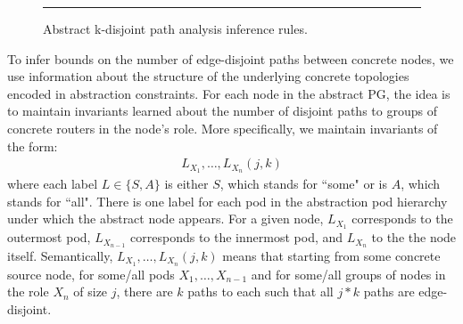 \documentclass[numbers, 10pt, preprint]{sigplanconf}
\begin{document}
\begin{figure}[t!]
  \begin{minipage}[t]{\linewidth}%
  \end{minipage}

  \vspace*{1em}
  \begin{minipage}[t]{\linewidth}%
  \end{minipage}

  \hrule
  \vspace*{1em}
  \caption{Abstract k-disjoint path analysis inference rules.}
  \label{fig:inference-rules}
  \vspace{-1.4em}
\end{figure}



%
To infer bounds on the number of edge-disjoint paths between concrete nodes, we use information about the structure of the underlying concrete topologies encoded in abstraction constraints.
%
For each node in the abstract PG,
the idea is to maintain invariants learned about the number of disjoint paths
to groups of concrete routers in the node's role.
More specifically, we maintain invariants of the form:
%
\[ \begin{array}{c}
  L_{X_1}, \ldots, L_{X_n}(j,k)
\end{array} \]
\noindent
%
where each label $L \in \{S,A\}$ is either $S$, which stands for ``some" or is $A$, which stands for ``all". There is one label for each pod in the abstraction pod hierarchy under which the abstract node appears. For a given node, $L_{X_1}$ corresponds to the outermost pod, $L_{X_{n-1}}$ corresponds to the innermost pod, and $L_{X_n}$ to the the node itself.
Semantically, $L_{X_1}, \ldots, L_{X_n}(j,k)$ means that starting from some concrete source node, for some/all pods $X_1, \ldots, X_{n-1}$
and for some/all groups of nodes in the role $X_n$ of size $j$,
there are $k$ paths to each such that all $j*k$ paths are edge-disjoint.
\end{document}
